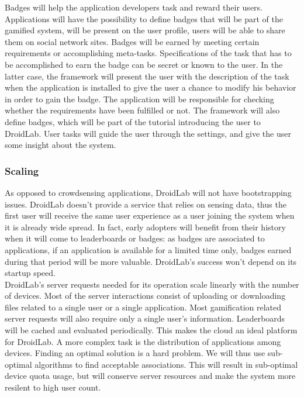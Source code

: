 \documentclass[conference,letterpaper]{IEEEtran}
\begin{document}
\indent Badges will help the application developers task and reward their users. Applications will have the possibility to define badges that will be part of the gamified system, will be present on the user profile, users will be able to share them on social network sites. Badges will be earned by meeting certain requirements or accomplishing meta-tasks. Specifications of the task that has to be accomplished to earn the badge can be secret or known to the user. In the latter case, the framework will present the user with the description of the task when the application is installed to give the user a chance to modify his behavior in order to gain the badge. The application will be responsible for checking whether the requirements have been fulfilled or not. The framework will also define badges, which will be part of the tutorial introducing the user to DroidLab. User tasks will guide the user through the settings, and give the user some insight about the system.
\subsubsection{Scaling}
As opposed to crowdsensing applications, DroidLab will not have bootstrapping issues. DroidLab doesn't provide a service that relies on sensing data, thus the first user will receive the same user experience as a user joining the system when it is already wide spread. In fact, early adopters will benefit from their history when it will come to leaderboards or badges: as badges are associated to applications, if an application is available for a limited time only, badges earned during that period will be more valuable. DroidLab's success won't depend on its startup speed.\\
\indent DroidLab's server requests needed for its operation scale linearly with the number of devices. Most of the server interactions consist of uploading or downloading files related to a single user or a single application. Most gamification related server requests will also require only a single user's information. Leaderboards will be cached and evaluated periodically. This makes the cloud an ideal platform for DroidLab. A more complex task is the distribution of applications among devices. Finding an optimal solution is a hard problem. We will thus use sub-optimal algorithms to find acceptable associations. This will result in sub-optimal device quota usage, but will conserve server resources and make the system more resilent to high user count.
\end{document}
